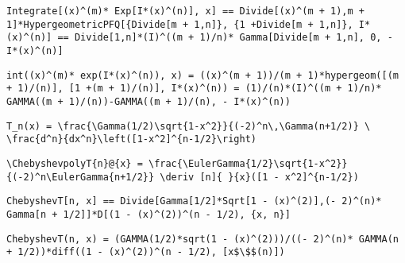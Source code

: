 \newsavebox\ASMM
\begin{lrbox}{\ASMM}
 \begin{minipage}[t]{0.82\textwidth}
  \lstinline[language={[latex]TeX},mathescape,breaklines=true]"Integrate[(x)^(m)* Exp[I*(x)^(n)], x] == Divide[(x)^(m + 1),m + 1]*HypergeometricPFQ[{Divide[m + 1,n]}, {1 +Divide[m + 1,n]}, I*(x)^(n)] == Divide[1,n]*(I)^((m + 1)/n)* Gamma[Divide[m + 1,n], 0, - I*(x)^(n)]"
 \end{minipage}
\end{lrbox}
\newsavebox\ASMA
\begin{lrbox}{\ASMA}
 \begin{minipage}[t]{0.82\textwidth}
  \lstinline[language={[latex]TeX},mathescape,breaklines=true]"int((x)^(m)* exp(I*(x)^(n)), x) = ((x)^(m + 1))/(m + 1)*hypergeom([(m + 1)/(n)], [1 +(m + 1)/(n)], I*(x)^(n)) = (1)/(n)*(I)^((m + 1)/n)* GAMMA((m + 1)/(n))-GAMMA((m + 1)/(n), - I*(x)^(n))"
 \end{minipage}
\end{lrbox}
\newsavebox\ATT
\begin{lrbox}{\ATT}
 \begin{minipage}[t]{0.82\textwidth}
  \lstinline[language={[latex]TeX},mathescape,breaklines=true]"T_n(x) = \frac{\Gamma(1/2)\sqrt{1-x^2}}{(-2)^n\,\Gamma(n+1/2)} \  \frac{d^n}{dx^n}\left([1-x^2]^{n-1/2}\right)"
 \end{minipage}
\end{lrbox}
\newsavebox\ATST
\begin{lrbox}{\ATST}
 \begin{minipage}[t]{0.82\textwidth}
  \lstinline[language={[latex]TeX},mathescape,breaklines=true]"\ChebyshevpolyT{n}@{x} = \frac{\EulerGamma{1/2}\sqrt{1-x^2}}{(-2)^n\EulerGamma{n+1/2}} \deriv [n]{ }{x}([1 - x^2]^{n-1/2})"
 \end{minipage}
\end{lrbox}
\newsavebox\ATMM
\begin{lrbox}{\ATMM}
 \begin{minipage}[t]{0.82\textwidth}
  \lstinline[language={[latex]TeX},mathescape,breaklines=true]"ChebyshevT[n, x] == Divide[Gamma[1/2]*Sqrt[1 - (x)^(2)],(- 2)^(n)* Gamma[n + 1/2]]*D[(1 - (x)^(2))^(n - 1/2), {x, n}]"
 \end{minipage}
\end{lrbox}
\newsavebox\ATMA
\begin{lrbox}{\ATMA}
 \begin{minipage}[t]{0.82\textwidth}
  \lstinline[language={[latex]TeX},mathescape,breaklines=true]"ChebyshevT(n, x) = (GAMMA(1/2)*sqrt(1 - (x)^(2)))/((- 2)^(n)* GAMMA(n + 1/2))*diff((1 - (x)^(2))^(n - 1/2), [x$\$$(n)])"
 \end{minipage}
\end{lrbox}

